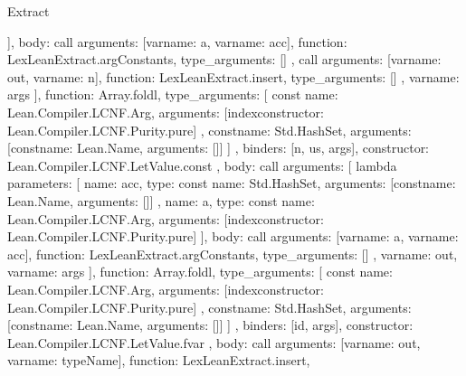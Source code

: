 \begin{lexlean}{Extract}
\begin{toolingmodule}
{{{{{{{{                      }
                    }
                  ],
                  body: call{
                    arguments: [var{name: a}, var{name: acc}],
                    function: LexLeanExtract.argConstants,
                    type_arguments: []
                  }
                },
                call{
                  arguments: [var{name: out}, var{name: n}],
                  function: LexLeanExtract.insert,
                  type_arguments: []
                },
                var{name: args}
              ],
              function: Array.foldl,
              type_arguments: [
                const{
                  name: Lean.Compiler.LCNF.Arg,
                  arguments: [index{constructor: Lean.Compiler.LCNF.Purity.pure}]
                },
                const{name: Std.HashSet, arguments: [const{name: Lean.Name, arguments: []}]}
              ]
            },
            binders: [n, us, args],
            constructor: Lean.Compiler.LCNF.LetValue.const
          },
          {
            body: call{
              arguments: [
                lambda{
                  parameters: [
                    {
                      name: acc,
                      type: const{
                        name: Std.HashSet,
                        arguments: [const{name: Lean.Name, arguments: []}]
                      }
                    },
                    {
                      name: a,
                      type: const{
                        name: Lean.Compiler.LCNF.Arg,
                        arguments: [index{constructor: Lean.Compiler.LCNF.Purity.pure}]
                      }
                    }
                  ],
                  body: call{
                    arguments: [var{name: a}, var{name: acc}],
                    function: LexLeanExtract.argConstants,
                    type_arguments: []
                  }
                },
                var{name: out},
                var{name: args}
              ],
              function: Array.foldl,
              type_arguments: [
                const{
                  name: Lean.Compiler.LCNF.Arg,
                  arguments: [index{constructor: Lean.Compiler.LCNF.Purity.pure}]
                },
                const{name: Std.HashSet, arguments: [const{name: Lean.Name, arguments: []}]}
              ]
            },
            binders: [id, args],
            constructor: Lean.Compiler.LCNF.LetValue.fvar
          },
          {
            body: call{
              arguments: [var{name: out}, var{name: typeName}],
              function: LexLeanExtract.insert,
}}}}}
\end{toolingmodule}
\end{lexlean}
